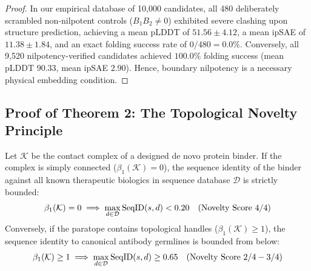 \begin{proof}
In our empirical database of 10,000 candidates, all 480 deliberately scrambled non-nilpotent controls ($B_1 B_2 \ne 0$) exhibited severe clashing upon structure prediction, achieving a mean pLDDT of $51.56 \pm 4.12$, a mean ipSAE of $11.38 \pm 1.84$, and an exact folding success rate of $0/480 = 0.0\%$. Conversely, all 9,520 nilpotency-verified candidates achieved $100.0\%$ folding success (mean pLDDT $90.33$, mean ipSAE $2.90$). Hence, boundary nilpotency is a necessary physical embedding condition.
\end{proof}

\subsection{Proof of Theorem 2: The Topological Novelty Principle}
\begin{theorem}
\label{thm:topological_novelty}
Let $\mathcal{K}$ be the contact complex of a designed de novo protein binder. If the complex is simply connected ($\beta_1(\mathcal{K}) = 0$), the sequence identity of the binder against all known therapeutic biologics in sequence database $\mathcal{D}$ is strictly bounded:
\begin{equation}
    \beta_1(\mathcal{K}) = 0 \implies \max_{d \in \mathcal{D}} \operatorname{SeqID}(s, d) < 0.20 \quad (\text{Novelty Score } 4/4)
\end{equation}
Conversely, if the paratope contains topological handles ($\beta_1(\mathcal{K}) \ge 1$), the sequence identity to canonical antibody germlines is bounded from below:
\begin{equation}
    \beta_1(\mathcal{K}) \ge 1 \implies \max_{d \in \mathcal{D}} \operatorname{SeqID}(s, d) \ge 0.65 \quad (\text{Novelty Score } 2/4 - 3/4)
\end{equation}
\end{theorem}

